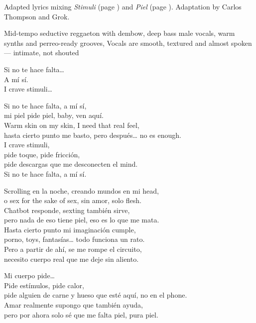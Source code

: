
\begin{notes}
Adapted lyrics mixing \emph{Stimuli} (page \pageref{sec:stimuli}) and \emph{Piel} (page \pageref{sec:piel}).
Adaptation by Carlos Thompson and Grok.
\end{notes}
\begin{style}
Mid-tempo seductive reggaeton with dembow, deep bass male vocals, warm synths and perreo-ready grooves, Vocals are smooth, textured and almost spoken — intimate, not shouted
\end{style}
\begin{lyrics}
Si no te hace falta…\\
A mí sí.\\
I crave stimuli…

Si no te hace falta, a mí sí,\\
mi piel pide piel, baby, ven aquí.\\
Warm skin on my skin, I need that real feel,\\
hasta cierto punto me basto, pero después… no es enough.\\
I crave stimuli,\\
pide toque, pide fricción,\\
pide descargas que me desconecten el mind.\\
Si no te hace falta, a mí sí.

Scrolling en la noche, creando mundos en mi head,\\
o sex for the sake of sex, sin amor, solo flesh.\\
Chatbot responde, sexting también sirve,\\
pero nada de eso tiene piel, eso es lo que me mata.\\
Hasta cierto punto mi imaginación cumple,\\
porno, toys, fantasías… todo funciona un rato.\\
Pero a partir de ahí, se me rompe el circuito,\\
necesito cuerpo real que me deje sin aliento.

Mi cuerpo pide…\\
Pide estímulos, pide calor,\\
pide alguien de carne y hueso que esté aquí, no en el phone.\\
Amar realmente supongo que también ayuda,\\
pero por ahora solo sé que me falta piel, pura piel.


\end{lyrics}
